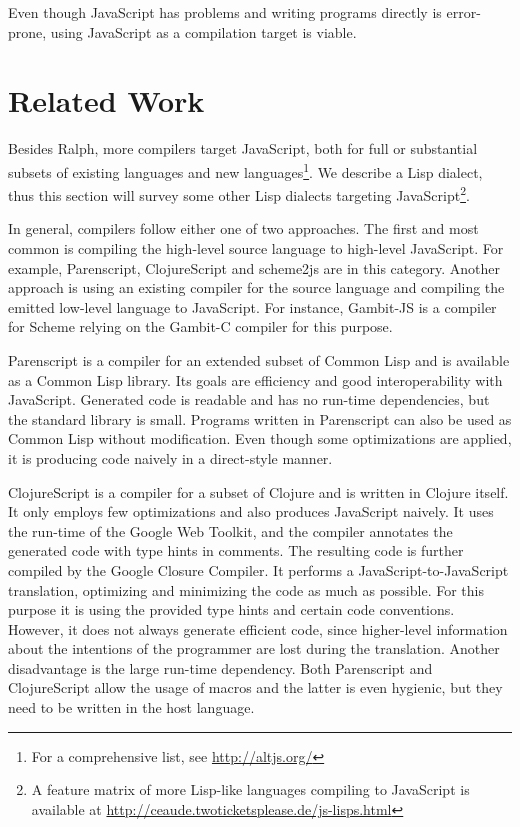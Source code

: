 \documentclass{acm_proc_article-sp}
\begin{document}
Even though JavaScript has problems and writing programs
directly is error-prone, using JavaScript as a compilation target is
viable.

\section{Related Work}\label{sec:related}

Besides Ralph, more compilers target JavaScript, both for full or
substantial subsets of existing languages and new
languages\footnote{For a comprehensive list, see
  \url{http://altjs.org/}}. We describe a Lisp dialect, thus this
section will survey some other Lisp dialects targeting
JavaScript\footnote{A feature matrix of more Lisp-like languages
  compiling to JavaScript is available at
  \url{http://ceaude.twoticketsplease.de/js-lisps.html}}.

In general, compilers follow either one of two approaches.
The first and most common is compiling the high-level source language
to high-level JavaScript. For example, Parenscript, ClojureScript
and scheme2js are in this category. Another approach is using an
existing compiler for the source language and compiling the emitted
low-level language to JavaScript. For instance, Gambit-JS is a
compiler for Scheme relying on the Gambit-C compiler for this purpose.

Parenscript is a compiler for an extended subset of Common Lisp and is
available as a Common Lisp library. Its goals are efficiency and good
interoperability with JavaScript. Generated code is readable and
has no run-time dependencies, but the standard library is small.
Programs written in Parenscript can also be used as Common Lisp
without modification. Even though some optimizations are applied, it
is producing code naively in a direct-style manner.

ClojureScript is a compiler for a subset of Clojure and is written in
Clojure itself. It only employs few optimizations and also produces
JavaScript naively. It uses the run-time of the Google Web Toolkit,
and the compiler annotates the generated code with type hints in
comments. The resulting code is further compiled by the Google Closure
Compiler. It performs a JavaScript-to-JavaScript translation,
optimizing and minimizing the code as much as possible. For this
purpose it is using the provided type hints and certain code
conventions. However, it does not always generate efficient code,
since higher-level information about the intentions of the programmer
are lost during the translation. Another disadvantage is the large
run-time dependency. Both Parenscript and ClojureScript allow the
usage of macros and the latter is even hygienic, but they need to be
written in the host language.
\end{document}
